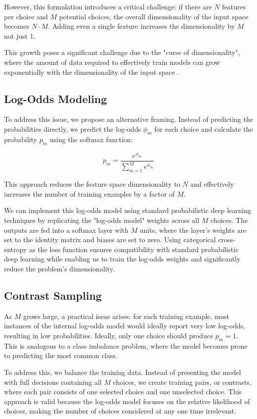 \documentclass[11pt]{article}
\begin{document}
However, this formulation introduces a critical challenge: if there are $N$ features per choice and $M$ potential choices, the overall dimensionality of the input space becomes $N \cdot M$. Adding even a single feature increases the dimensionality by $M$ not just 1.

This growth poses a significant challenge due to the "curse of dimensionality", where the amount of data required to effectively train models can grow exponentially with the dimensionality of the input space \citep{curse}.

\subsection*{Log-Odds Modeling}

To address this issue, we propose an alternative framing. Instead of predicting the probabilities directly, we predict the log-odds $\phi_m$ for each choice and calculate the probability $p_m$ using the softmax function:

$$p_m = \frac{e^{\phi_m}}{\sum_{m=1}^{M}e^{\phi_m}}$$

This approach reduces the feature space dimensionality to $N$ and effectively increases the number of training examples by a factor of $M$.

We can implement this log-odds model using standard probabilistic deep learning techniques by replicating the "log-odds model" weights across all $M$ choices. The outputs are fed into a softmax layer with $M$ units, where the layer's weights are set to the identity matrix and biases are set to zero. Using categorical cross-entropy as the loss function ensures compatibility with standard probabilistic deep learning while enabling us to train the log-odds weights and significantly reduce the problem's dimensionality.

\subsection*{Contrast Sampling}

As $M$ grows large, a practical issue arises: for each training example, most instances of the internal log-odds model would ideally report very low log-odds, resulting in low probabilities. Ideally, only one choice should produce $p_m=1$. This is analogous to a class imbalance problem, where the model becomes prone to predicting the most common class.

To address this, we balance the training data. Instead of presenting the model with full decisions containing all $M$ choices, we create training pairs, or contrasts, where each pair consists of one selected choice and one unselected choice. This approach is valid because the log-odds model focuses on the relative likelihood of choices, making the number of choices considered at any one time irrelevant.
\end{document}
